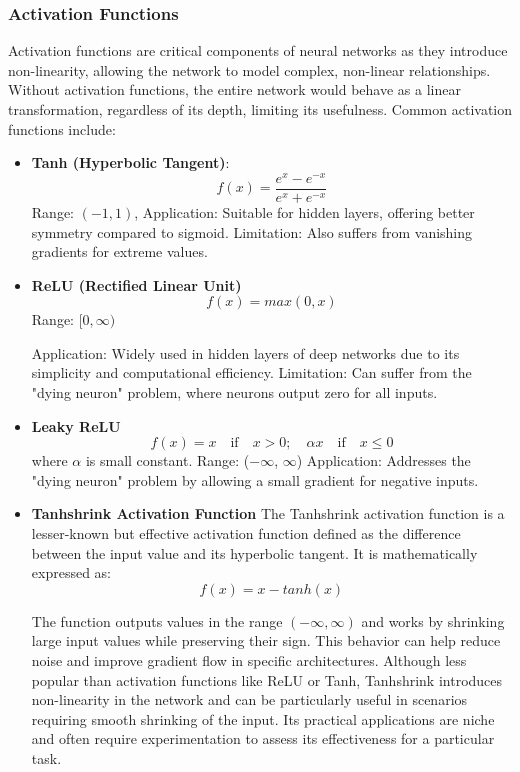 \documentclass[english,12pt, titlepage]{article}
\begin{document}
	
	\subsubsection{Activation Functions}
	Activation functions are critical components of neural networks as they introduce non-linearity, allowing the network to model complex, non-linear relationships. Without activation functions, the entire network would behave as a linear transformation, regardless of its depth, limiting its usefulness. Common activation functions include:
	
	\begin{itemize}
		\item \textbf{Tanh (Hyperbolic Tangent)}: 
		\begin{equation*}
			f(x) = \frac{e^{x} - e^{-x}}{e^{x} + e^{-x}}
		\end{equation*}
		Range: $(-1, 1)$, Application: Suitable for hidden layers, offering better symmetry compared to sigmoid.
		Limitation: Also suffers from vanishing gradients for extreme values.
		\item  \textbf{ReLU (Rectified Linear Unit)}
		\begin{equation*}
			f(x) =max(0,x)
		\end{equation*}
		Range: $[0, \infty)$
		
		Application: Widely used in hidden layers of deep networks due to its simplicity and computational efficiency.
		Limitation: Can suffer from the "dying neuron" problem, where neurons output zero for all inputs.
		\item \textbf{Leaky ReLU}
		\begin{equation*}
			f(x) = x \quad \text{if} \quad x>0;\quad  \alpha x \quad \text{if} \quad  x \leq 0 
		\end{equation*}
		where $\alpha$ is small constant. Range: ($-\infty$, $\infty$)
		Application: Addresses the "dying neuron" problem by allowing a small gradient for negative inputs.
		\item \textbf{Tanhshrink Activation Function} The Tanhshrink activation function is a lesser-known but effective activation function defined as the difference between the input value and its hyperbolic tangent. It is mathematically expressed as:
		\begin{equation*}
			f(x) = x - tanh(x)
		\end{equation*}
		
		The function outputs values in the range $(-\infty, \infty)$ and works by shrinking large input values while preserving their sign. This behavior can help reduce noise and improve gradient flow in specific architectures. Although less popular than activation functions like ReLU or Tanh, Tanhshrink introduces non-linearity in the network and can be particularly useful in scenarios requiring smooth shrinking of the input. Its practical applications are niche and often require experimentation to assess its effectiveness for a particular task.
		

\end{itemize}
\end{document}
